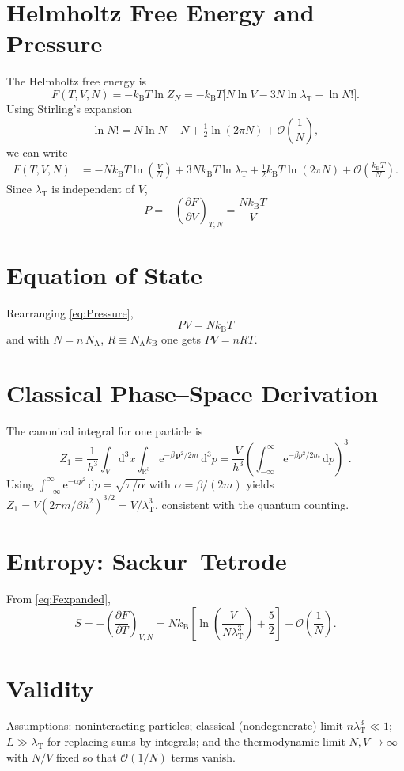 \documentclass[12pt]{article}
\numberwithin{equation}{section}
\newcommand{\kB}{k_{\mathrm B}}
\newcommand{\NA}{N_{\mathrm A}}
\newcommand{\lamT}{\lambda_{\mathrm T}}
\newcommand{\dd}{\mathrm d}  %
\newcommand{\ee}{\mathrm e}  %
\begin{document}
\section{Helmholtz Free Energy and Pressure}
The Helmholtz free energy is
\begin{equation}
F(T,V,N)=-\kB T\ln Z_N=-\kB T\big[N\ln V-3N\ln\lamT-\ln N!\big].
\label{eq:Fraw}
\end{equation}
Using Stirling’s expansion
\begin{equation}
\ln N!=N\ln N-N+\tfrac{1}{2}\ln(2\pi N)+\mathcal O\!\left(\frac{1}{N}\right),
\label{eq:stirling}
\end{equation}
we can write
\begin{align}
F(T,V,N)&=-N\kB T\ln\!\left(\frac{V}{N}\right)+3N\kB T\ln\lamT +\tfrac{1}{2}\kB T\ln(2\pi N)+\mathcal O\!\left(\tfrac{\kB T}{N}\right).
\label{eq:Fexpanded}
\end{align}
Since $\lamT$ is independent of $V$,
\begin{equation}
\boxed{\;P=-\left(\frac{\partial F}{\partial V}\right)_{T,N}=\frac{N\kB T}{V}\;}
\label{eq:Pressure}
\end{equation}

\section{Equation of State}
Rearranging \cref{eq:Pressure},
\begin{equation}
\boxed{\;PV=N\kB T\;}
\label{eq:IGL}
\end{equation}
and with $N=n\,\NA$, $R\equiv \NA\kB$ one gets $PV=nRT$.

\section{Classical Phase--Space Derivation}
The canonical integral for one particle is
\begin{equation}
Z_1=\frac{1}{h^3}\int_V\dd^3x\int_{\mathbb R^3}\ee^{-\beta\,\bm p^2/2m}\,\dd^3p
=\frac{V}{h^3}\left(\int_{-\infty}^{\infty}\ee^{-\beta p^2/2m}\,\dd p\right)^{\!3}.
\end{equation}
Using $\int_{-\infty}^{\infty}\ee^{-\alpha p^2}\,\dd p=\sqrt{\pi/\alpha}$ with $\alpha=\beta/(2m)$ yields $Z_1=V(2\pi m/\beta h^2)^{3/2}=V/\lamT^3$, consistent with the quantum counting.

\section{Entropy: Sackur--Tetrode}
From \cref{eq:Fexpanded},
\begin{equation}
S= -\left(\frac{\partial F}{\partial T}\right)_{V,N}
= N\kB\left[\ln\!\left(\frac{V}{N\lamT^3}\right)+\frac{5}{2}\right] + \mathcal O\!\left(\frac{1}{N}\right).
\label{eq:ST}
\end{equation}

\section{Validity}
Assumptions: noninteracting particles; classical (nondegenerate) limit $n\lamT^3\ll1$; $L\gg \lamT$ for replacing sums by integrals; and the thermodynamic limit $N,V\to\infty$ with $N/V$ fixed so that $\mathcal O(1/N)$ terms vanish.
\end{document}
